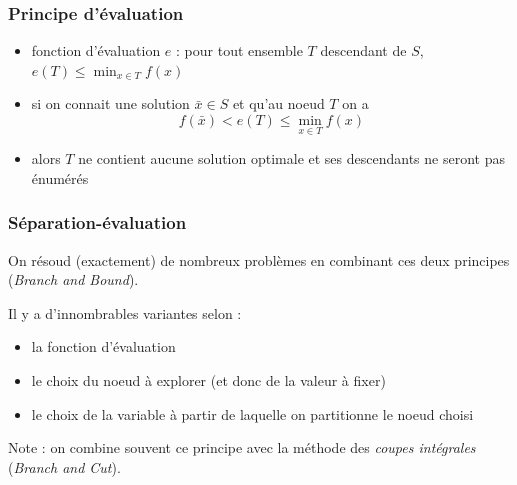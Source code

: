 \documentclass{beamer}
\begin{document}
\begin{frame}
  \frametitle{Principe d'évaluation}

  \begin{itemize}
  \item fonction d'évaluation $e$ : pour tout ensemble $T$ descendant de $S$,
    $e(T) \leq \min_{x \in T} f(x)$
  \item si on connait une solution $\bar{x} \in S$ et qu'au noeud $T$ on a
    \[f(\bar{x}) < e(T) \leq \min_{x \in T} f(x) \]
  \item alors $T$ ne contient aucune solution optimale et ses descendants
    ne seront pas énumérés
  \end{itemize}
  
\end{frame}

\begin{frame}
  \frametitle{Séparation-évaluation}

  On résoud (exactement) de nombreux problèmes en combinant ces deux principes
  (\emph{Branch and Bound}).

  Il y a d'innombrables variantes selon :
  \begin{itemize}
  \item la fonction d'évaluation
  \item le choix du noeud à explorer (et donc de la valeur à fixer)
  \item le choix de la variable à partir de laquelle on partitionne le noeud choisi
  \end{itemize}

  Note : on combine souvent ce principe avec la méthode des \emph{coupes intégrales}
  (\emph{Branch and Cut}). 
  
\end{frame}
\end{document}
